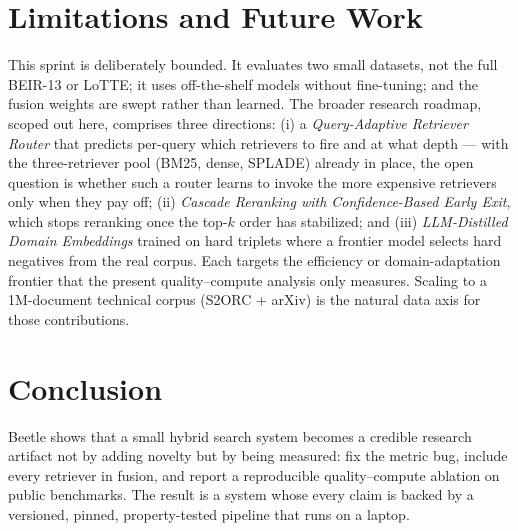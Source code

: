 \documentclass[11pt]{article}
\begin{document}
\section{Limitations and Future Work}
\label{sec:future}

This sprint is deliberately bounded. It evaluates two small datasets, not the
full BEIR-13 or LoTTE; it uses off-the-shelf models without fine-tuning; and the
fusion weights are swept rather than learned. The broader research roadmap, scoped
out here, comprises three directions: (i) a \emph{Query-Adaptive Retriever Router}
that predicts per-query which retrievers to fire and at what depth --- with the
three-retriever pool (BM25, dense, SPLADE) already in place, the open
question is whether such a router learns to invoke the more expensive retrievers
only when they pay off; (ii) \emph{Cascade Reranking with Confidence-Based
Early Exit}, which stops reranking once the top-$k$ order has stabilized; and
(iii) \emph{LLM-Distilled Domain Embeddings} trained on hard triplets where a
frontier model selects hard negatives from the real corpus. Each targets the
efficiency or domain-adaptation frontier that the present quality--compute analysis
only measures. Scaling to a 1M-document technical corpus (S2ORC + arXiv) is the
natural data axis for those contributions.

\section{Conclusion}
\label{sec:conclusion}

Beetle shows that a small hybrid search system becomes a credible research artifact
not by adding novelty but by being measured: fix the metric bug, include every
retriever in fusion, and report a reproducible quality--compute ablation on public
benchmarks. The result is a system whose every claim is backed by a versioned,
pinned, property-tested pipeline that runs on a laptop.



\end{document}
